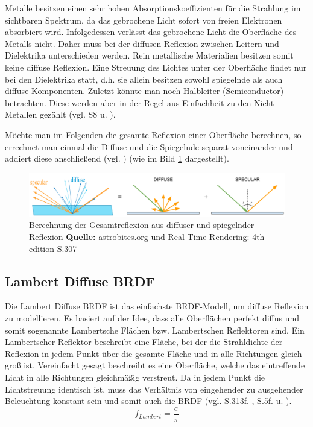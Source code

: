 \documentclass[
  11pt,
  a4paper,
  oneside
  ]{article}
\begin{document}
Metalle besitzen einen sehr hohen Absorptionskoeffizienten für die Strahlung im sichtbaren Spektrum, da das gebrochene Licht sofort von freien Elektronen absorbiert wird. Infolgedessen verlässt das gebrochene Licht die Oberfläche des Metalls nicht. Daher muss bei der diffusen Reflexion zwischen Leitern und Dielektrika unterschieden werden. Rein metallische Materialien besitzen somit keine diffuse Reflexion. Eine Streuung des Lichtes unter der Oberfläche findet nur bei den Dielektrika statt, d.h. sie allein besitzen sowohl spiegelnde als auch diffuse Komponenten. Zuletzt könnte man noch Halbleiter (Semiconductor) betrachten. Diese werden aber in der Regel aus Einfachheit zu den Nicht-Metallen gezählt 
(vgl. S8 \cite{rtrPaper} u. \cite{pbrGuide,learnOpenGL,googleFilamentPbr}).

Möchte man im Folgenden die gesamte Reflexion einer Oberfläche berechnen, so errechnet man einmal die Diffuse und die Spiegelnde separat voneinander und addiert diese anschließend (vgl. \cite{learnOpenGL}) (wie im Bild \ref{fig:img1} dargestellt).
\begin{figure}[H]
  \centering
  \includegraphics*[width=1 \textwidth]{images/brdf.PNG}
  \caption{Berechnung der Gesamtreflexion aus diffuser und spiegelnder Reflexion \footnotesize\textbf{Quelle:} \url{astrobites.org} \cite{astrobites} und Real-Time Rendering: 4th edition S.307 \cite{realTimeRendering4th}}
  \label{fig:img1}
\end{figure}

\subsection{Lambert Diffuse BRDF}
Die Lambert Diffuse BRDF ist das einfachste BRDF-Modell, um diffuse Reflexion zu modellieren. Es basiert auf der Idee, dass alle Oberflächen perfekt diffus und somit sogenannte Lambertsche Flächen bzw. Lambertschen Reflektoren sind. Ein Lambertscher Reflektor beschreibt eine Fläche, bei der die Strahldichte der Reflexion in jedem Punkt über die gesamte Fläche und in alle Richtungen gleich groß ist. Vereinfacht gesagt beschreibt es eine Oberfläche, welche das eintreffende Licht in alle Richtungen gleichmäßig verstreut. Da in jedem Punkt die Lichtstreuung identisch ist, muss das Verhältnis von eingehender zu ausgehender Beleuchtung konstant sein und somit auch die BRDF 
(vgl. S.313f. \cite{realTimeRendering4th}, S.5f. \cite{irrlichtOrg} u. \cite{learnOpenGL}). 
\begin{equation}
  f_{Lambert}=\dfrac{c}{\pi}
\end{equation}
\end{document}
